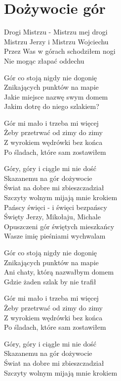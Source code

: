 \section{Dożywocie gór}
\begin{text}
    Drogi Mistrzu - Mistrzu mej drogi\\
    Mistrzu Jerzy i Mistrzu Wojciechu\\
    Przez Was w górach schodziłem nogi\\
    Nie mogąc złapać oddechu

    Gór co stoją nigdy nie dogonię\\
    Znikających punktów na mapie\\
    Jakie miejsce nazwę swym domem\\
    Jakim dotrę do niego szlakiem?

    \hfill\break
    \vin Gór mi mało i trzeba mi więcej\\
    \vin Żeby przetrwać od zimy do zimy\\
    \vin Z wyrokiem wędrówki bez końca\\
    \vin Po śladach, które sam zostawiłem

    \vin Góry, góry i ciągle mi nie dość\\
    \vin Skazanemu na gór dożywocie\\
    \vin Świat na dobre mi zbieszczadział\\
    \vin Szczyty wolnym mijają mnie krokiem\\

    Pańscy święci - i święci bezpańscy\\
    Święty Jerzy, Mikołaju, Michale\\
    Opuszczeni gór świętych mieszkańcy\\
    Wasze imię pieśniami wychwalam

    Gór co stoją nigdy nie dogonię\\
    Znikających punktów na mapie\\
    Ani chaty, którą nazwałbym domem\\
    Gdzie żaden szlak by nie trafił

    \vin Gór mi mało i trzeba mi więcej\\
    \vin Żeby przetrwać od zimy do zimy\\
    \vin Z wyrokiem wędrówki bez końca\\
    \vin Po śladach, które sam zostawiłem

    \vin Góry, góry i ciągle mi nie dość\\
    \vin Skazanemu na gór dożywocie\\
    \vin Świat na dobre mi zbieszczadział\\
    \vin Szczyty wolnym mijają mnie krokiem


\end{text}
